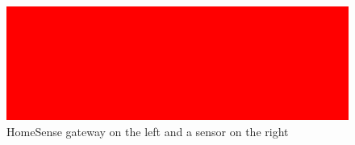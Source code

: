 \begin{figure}[H]\begin{center}
 \centering
  \captionsetup{justification=centering}
  \includegraphics[width=1\textwidth]{pictures/sample/red}
  \caption{HomeSense gateway on the left and a sensor on the right\label{fig:Proposal-HomeSense}}
\end{center}\end{figure}



